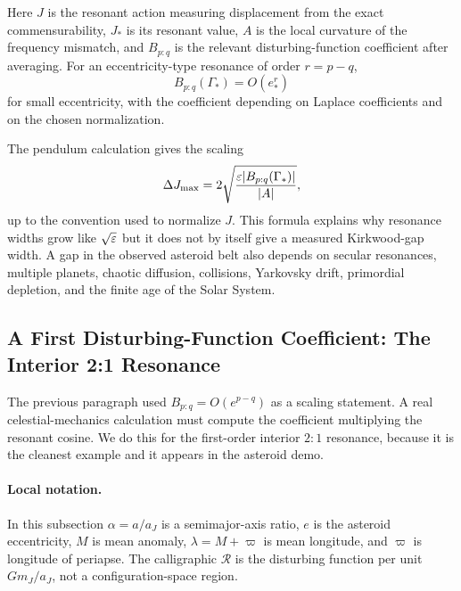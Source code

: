 Here \(J\) is the resonant action measuring displacement from the exact
commensurability, \(J_*\) is its resonant value, \(A\) is the local curvature of
the frequency mismatch, and \(B_{p:q}\) is the relevant disturbing-function
coefficient after averaging.  For an eccentricity-type resonance of order
\(r=p-q\),
\[
  B_{p:q}(\Gamma_*)=O(e_*^r)
\]
for small eccentricity, with the coefficient depending on Laplace coefficients
and on the chosen normalization.

The pendulum calculation gives the scaling
\[
  \Delta J_{\max}
  =
  2\sqrt{\frac{\varepsilon |B_{p:q}(\Gamma_*)|}{|A|}},
\]
up to the convention used to normalize \(J\).  This formula explains why
resonance widths grow like \(\sqrt{\varepsilon}\) but it does not by itself give a
measured Kirkwood-gap width.  A gap in the observed asteroid belt also depends
on secular resonances, multiple planets, chaotic diffusion, collisions,
Yarkovsky drift, primordial depletion, and the finite age of the Solar System.

\subsection{A First Disturbing-Function Coefficient: The Interior 2:1 Resonance}
\label{subsec:disturbing-function-2to1}

The previous paragraph used \(B_{p:q}=O(e^{p-q})\) as a scaling statement.  A
real celestial-mechanics calculation must compute the coefficient multiplying
the resonant cosine.  We do this for the first-order interior \(2:1\)
resonance, because it is the cleanest example and it appears in the asteroid
demo.

\paragraph{Local notation.}
In this subsection \(\alpha=a/a_J\) is a semimajor-axis ratio, \(e\) is the
asteroid eccentricity, \(M\) is mean anomaly, \(\lambda=M+\varpi\) is mean
longitude, and \(\varpi\) is longitude of periapse.  The calligraphic
\(\mathcal R\) is the disturbing function per unit \(Gm_J/a_J\), not a
configuration-space region.

